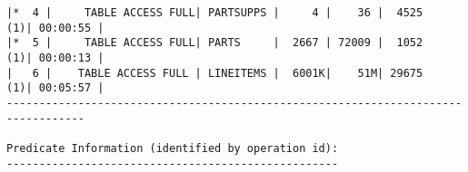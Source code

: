 \documentclass[11pt,a4paper,parskip=half]{scrartcl}
\begin{document}
\begin{lstlisting}
|*  4 |     TABLE ACCESS FULL| PARTSUPPS |     4 |    36 |  4525   (1)| 00:00:55 |                                                                                                                                                                                                                           
|*  5 |     TABLE ACCESS FULL| PARTS     |  2667 | 72009 |  1052   (1)| 00:00:13 |                                                                                                                                                                                                                           
|   6 |    TABLE ACCESS FULL | LINEITEMS |  6001K|    51M| 29675   (1)| 00:05:57 |                                                                                                                                                                                                                           
----------------------------------------------------------------------------------                                                                                                                                                                                                                           
                                                                                                                                                                                                                                                                                                             
Predicate Information (identified by operation id):                                                                                                                                                                                                                                                          
---------------------------------------------------                                                                                                                                                                                                                                                          
                                                                                                                                                                                                                                                                                                             

\end{lstlisting}
\end{document}
